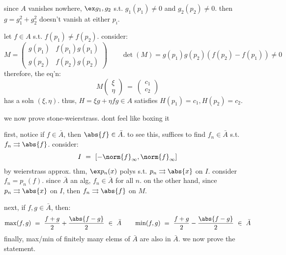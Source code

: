 \begin{pf}[source=Primary Source Material]
	since $A$ vanishes nowhere, $\ex g_{1},g_{2}$ s.t. $g_{1}(p_{1})\neq0$
	and $g_{2}(p_{2})\neq0$. then $g=g_{1}^{2}+g_{2}^{2}$ doesn't vanish at
	either $p_{i}$.

	let $f\in A$ s.t. $f(p_{1})\neq f(p_{2})$. consider:
	\begin{equation*}
		M =
		\begin{pmatrix}
			g(p_{1}) & f(p_{1})g(p_{1}) \\
			g(p_{2}) & f(p_{2})g(p_{2})
		\end{pmatrix} \qquad
		\det(M) = g(p_{1})g(p_{2})(f(p_{2})-f(p_{1})) \neq 0
	\end{equation*}
	therefore, the eq'n:
	\begin{equation*}
		M
		\begin{pmatrix}
			\xi \\ \eta
		\end{pmatrix}
		\ = \
		\begin{pmatrix}
			c_{1} \\ c_{2}
		\end{pmatrix}
	\end{equation*}
	has a soln $(\xi,\eta)$.
	thus, $H=\xi g+\eta fg\in A$ satisfies $H(p_{1})=c_{1},H(p_{2})=c_{2}$.
\end{pf}

we now prove stone-weierstrass. dont feel like boxing it

first, notice if $f\in\bar{A}$, then $\abs{f}\in\bar{A}$.
to see this, suffices to find $f_{n}\in\bar{A}$ s.t. $f_{n}\rightrightarrows\abs{f}$.
consider:
\begin{equation*}
	I \ = \ [-\norm{f}_{\infty},\norm{f}_{\infty}]
\end{equation*}
by weierstrass approx. thm, $\ex p_{n}(x)$ polys s.t. $p_{n}\rightrightarrows\abs{x}$ on $I$.
consider $f_{n}=p_{n}(f)$. since $\bar{A}$ an alg, $f_{n}\in\bar{A}$ for all $n$.
on the other hand, since $p_{n}\rightrightarrows\abs{x}$ on $I$, then
$f_{n}\rightrightarrows\abs{f}$ on $M$.

next, if $f,g\in\bar{A}$, then:
\begin{equation*}
	\max(f,g) \ = \ \frac{f+g}{2}+\frac{\abs{f-g}}{2} \ \in \ \bar{A} \qquad
	\min(f,g) \ = \ \frac{f+g}{2}-\frac{\abs{f-g}}{2} \ \in \ \bar{A}
\end{equation*}
finally, max/min of finitely many elems of $\bar{A}$ are also in $\bar{A}$.
we now prove the statement.

